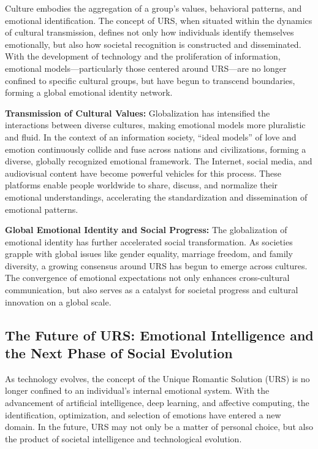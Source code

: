 \documentclass[12pt]{article}
\begin{document}
Culture embodies the aggregation of a group’s values, behavioral patterns, and emotional identification. The concept of URS, when situated within the dynamics of cultural transmission, defines not only how individuals identify themselves emotionally, but also how societal recognition is constructed and disseminated. With the development of technology and the proliferation of information, emotional models—particularly those centered around URS—are no longer confined to specific cultural groups, but have begun to transcend boundaries, forming a global emotional identity network.

\textbf{Transmission of Cultural Values:} Globalization has intensified the interactions between diverse cultures, making emotional models more pluralistic and fluid. In the context of an information society, ``ideal models'' of love and emotion continuously collide and fuse across nations and civilizations, forming a diverse, globally recognized emotional framework. The Internet, social media, and audiovisual content have become powerful vehicles for this process. These platforms enable people worldwide to share, discuss, and normalize their emotional understandings, accelerating the standardization and dissemination of emotional patterns.

\textbf{Global Emotional Identity and Social Progress:} The globalization of emotional identity has further accelerated social transformation. As societies grapple with global issues like gender equality, marriage freedom, and family diversity, a growing consensus around URS has begun to emerge across cultures. The convergence of emotional expectations not only enhances cross-cultural communication, but also serves as a catalyst for societal progress and cultural innovation on a global scale.

\subsection{The Future of URS: Emotional Intelligence and the Next Phase of Social Evolution}

As technology evolves, the concept of the Unique Romantic Solution (URS) is no longer confined to an individual's internal emotional system. With the advancement of artificial intelligence, deep learning, and affective computing, the identification, optimization, and selection of emotions have entered a new domain. In the future, URS may not only be a matter of personal choice, but also the product of societal intelligence and technological evolution.
\end{document}
